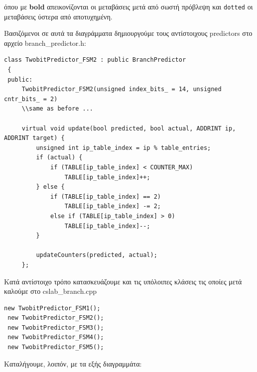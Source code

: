 \documentclass{article}
\begin{document}
 όπου με \textbf{bold} απεικονίζονται οι μεταβάσεις μετά από σωστή πρόβλεψη και \texttt{dotted} οι μεταβάσεις ύστερα από αποτυχημένη.

 Βασιζόμενοι σε αυτά τα διαγράμματα δημιουργούμε τους αντίστοιχους predictors στο αρχείο branch\_predictor.h:
 \begin{lstlisting}[style=cppstyle]
 class TwobitPredictor_FSM2 : public BranchPredictor
 {
 public:
     TwobitPredictor_FSM2(unsigned index_bits_ = 14, unsigned cntr_bits_ = 2)
     \\same as before ...

     virtual void update(bool predicted, bool actual, ADDRINT ip, ADDRINT target) {
         unsigned int ip_table_index = ip % table_entries;
         if (actual) {
             if (TABLE[ip_table_index] < COUNTER_MAX)
                 TABLE[ip_table_index]++;
         } else {
             if (TABLE[ip_table_index] == 2)
                 TABLE[ip_table_index] -= 2;
             else if (TABLE[ip_table_index] > 0)
                 TABLE[ip_table_index]--;
         }

         updateCounters(predicted, actual);
     };
 \end{lstlisting}
 Κατά αντίστοιχο τρόπο κατασκευάζουμε και τις υπόλοιπες κλάσεις τις οποίες μετά καλούμε στο cslab\_branch.cpp

 \begin{lstlisting}[style=cppstyle]
 new TwobitPredictor_FSM1();
 new TwobitPredictor_FSM2();
 new TwobitPredictor_FSM3();
 new TwobitPredictor_FSM4();
 new TwobitPredictor_FSM5();
 \end{lstlisting}

 \pagebreak
 Καταλήγουμε, λοιπόν, με τα εξής διαγραμμάτα:
 
\end{document}
